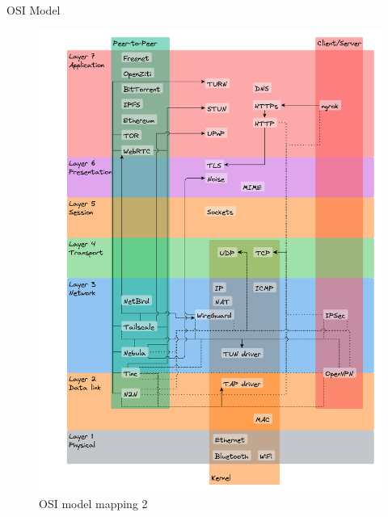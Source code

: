 \begin{frame}{OSI Model}
\begin{figure}
\centering
\includegraphics[width=\textwidth,height=0.9\textheight]{notes/../figures/osi-map.yed.png}
\caption{OSI model mapping 2}
\end{figure}

\newpage


\end{frame}
